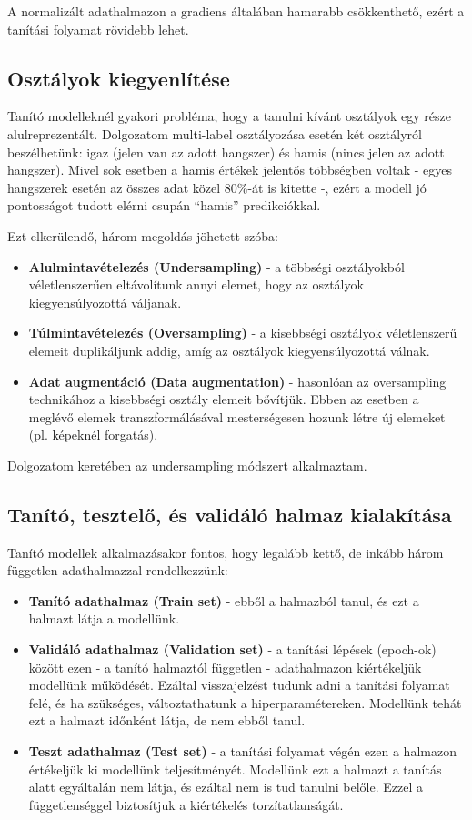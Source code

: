 A normalizált adathalmazon a gradiens általában hamarabb csökkenthető, ezért a tanítási folyamat rövidebb lehet. \cite{LeCun2012}

\subsection{Osztályok kiegyenlítése}

Tanító modelleknél gyakori probléma, hogy a tanulni kívánt osztályok egy része alulreprezentált. Dolgozatom multi-label osztályozása esetén két osztályról beszélhetünk: igaz (jelen van az adott hangszer) és hamis (nincs jelen az adott hangszer). Mivel sok esetben a hamis értékek jelentős többségben voltak - egyes hangszerek esetén az összes adat közel 80\%-át is kitette -, ezért a modell jó pontosságot tudott elérni csupán “hamis” predikciókkal.

Ezt elkerülendő, három megoldás jöhetett szóba:
\begin{itemize}
 \item \textbf{Alulmintavételezés (Undersampling)} - a többségi osztályokból véletlenszerűen eltávolítunk annyi elemet, hogy az osztályok kiegyensúlyozottá váljanak.
 \item \textbf{Túlmintavételezés (Oversampling)} - a kisebbségi osztályok véletlenszerű elemeit duplikáljunk addig, amíg az osztályok kiegyensúlyozottá válnak.
 \item \textbf{Adat augmentáció (Data augmentation)} - hasonlóan az oversampling technikához a kisebbségi osztály elemeit bővítjük. Ebben az esetben a meglévő elemek transzformálásával mesterségesen hozunk létre új elemeket (pl. képeknél forgatás). \cite{imbalanced}
\end{itemize}

Dolgozatom keretében az undersampling módszert alkalmaztam.

\subsection{Tanító, tesztelő, és validáló halmaz kialakítása}

Tanító modellek alkalmazásakor fontos, hogy legalább kettő, de inkább három független adathalmazzal rendelkezzünk: 
\begin{itemize}
 \item \textbf{Tanító adathalmaz (Train set)} - ebből a halmazból tanul, és ezt a halmazt látja a modellünk.
 \item \textbf{Validáló adathalmaz (Validation set)} - a tanítási lépések (epoch-ok) között ezen - a tanító halmaztól független - adathalmazon kiértékeljük modellünk működését. Ezáltal visszajelzést tudunk adni a tanítási folyamat felé, és ha szükséges, változtathatunk a hiperparamétereken. Modellünk tehát ezt a halmazt időnként látja, de nem ebből tanul.
 \item \textbf{Teszt adathalmaz (Test set)} - a tanítási folyamat végén ezen a halmazon értékeljük ki modellünk teljesítményét. Modellünk ezt a halmazt a tanítás alatt egyáltalán nem látja, és ezáltal nem is tud tanulni belőle. Ezzel a függetlenséggel biztosítjuk a kiértékelés torzítatlanságát. \cite{traintestvalid}
\end{itemize}

